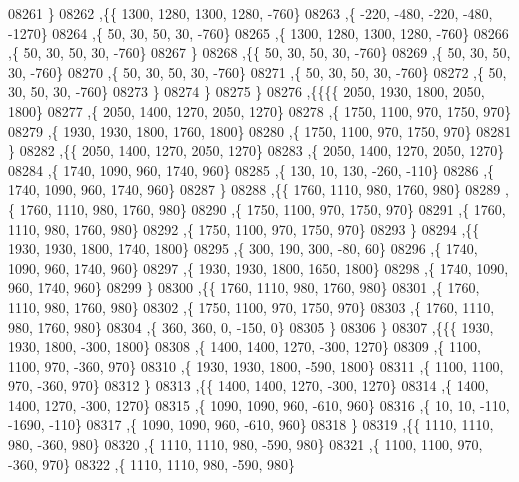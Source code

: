 \begin{DoxyCode}
08261     \}
08262    ,\{\{  1300,  1280,  1300,  1280,  -760\}
08263     ,\{  -220,  -480,  -220,  -480, -1270\}
08264     ,\{    50,    30,    50,    30,  -760\}
08265     ,\{  1300,  1280,  1300,  1280,  -760\}
08266     ,\{    50,    30,    50,    30,  -760\}
08267     \}
08268    ,\{\{    50,    30,    50,    30,  -760\}
08269     ,\{    50,    30,    50,    30,  -760\}
08270     ,\{    50,    30,    50,    30,  -760\}
08271     ,\{    50,    30,    50,    30,  -760\}
08272     ,\{    50,    30,    50,    30,  -760\}
08273     \}
08274    \}
08275   \}
08276  ,\{\{\{\{  2050,  1930,  1800,  2050,  1800\}
08277     ,\{  2050,  1400,  1270,  2050,  1270\}
08278     ,\{  1750,  1100,   970,  1750,   970\}
08279     ,\{  1930,  1930,  1800,  1760,  1800\}
08280     ,\{  1750,  1100,   970,  1750,   970\}
08281     \}
08282    ,\{\{  2050,  1400,  1270,  2050,  1270\}
08283     ,\{  2050,  1400,  1270,  2050,  1270\}
08284     ,\{  1740,  1090,   960,  1740,   960\}
08285     ,\{   130,    10,   130,  -260,  -110\}
08286     ,\{  1740,  1090,   960,  1740,   960\}
08287     \}
08288    ,\{\{  1760,  1110,   980,  1760,   980\}
08289     ,\{  1760,  1110,   980,  1760,   980\}
08290     ,\{  1750,  1100,   970,  1750,   970\}
08291     ,\{  1760,  1110,   980,  1760,   980\}
08292     ,\{  1750,  1100,   970,  1750,   970\}
08293     \}
08294    ,\{\{  1930,  1930,  1800,  1740,  1800\}
08295     ,\{   300,   190,   300,   -80,    60\}
08296     ,\{  1740,  1090,   960,  1740,   960\}
08297     ,\{  1930,  1930,  1800,  1650,  1800\}
08298     ,\{  1740,  1090,   960,  1740,   960\}
08299     \}
08300    ,\{\{  1760,  1110,   980,  1760,   980\}
08301     ,\{  1760,  1110,   980,  1760,   980\}
08302     ,\{  1750,  1100,   970,  1750,   970\}
08303     ,\{  1760,  1110,   980,  1760,   980\}
08304     ,\{   360,   360,     0,  -150,     0\}
08305     \}
08306    \}
08307   ,\{\{\{  1930,  1930,  1800,  -300,  1800\}
08308     ,\{  1400,  1400,  1270,  -300,  1270\}
08309     ,\{  1100,  1100,   970,  -360,   970\}
08310     ,\{  1930,  1930,  1800,  -590,  1800\}
08311     ,\{  1100,  1100,   970,  -360,   970\}
08312     \}
08313    ,\{\{  1400,  1400,  1270,  -300,  1270\}
08314     ,\{  1400,  1400,  1270,  -300,  1270\}
08315     ,\{  1090,  1090,   960,  -610,   960\}
08316     ,\{    10,    10,  -110, -1690,  -110\}
08317     ,\{  1090,  1090,   960,  -610,   960\}
08318     \}
08319    ,\{\{  1110,  1110,   980,  -360,   980\}
08320     ,\{  1110,  1110,   980,  -590,   980\}
08321     ,\{  1100,  1100,   970,  -360,   970\}
08322     ,\{  1110,  1110,   980,  -590,   980\}

\end{DoxyCode}
